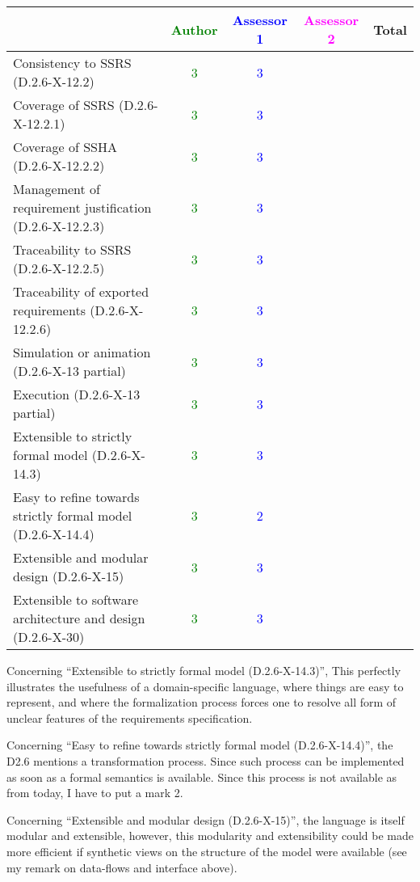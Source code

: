 \begin{tabular}{|l | c | c | c | c|}
\hline
& \textcolor{green}{Author} & \textcolor{blue}{Assessor 1} & \textcolor{magenta}{Assessor 2} & Total \\
\hline 
Consistency to SSRS (D.2.6-X-12.2) & \textcolor{green}{3} & \textcolor{blue}{3} & &  \\
\hline
Coverage of SSRS (D.2.6-X-12.2.1)  & \textcolor{green}{3} & \textcolor{blue}{3} & &  \\
\hline
Coverage of SSHA (D.2.6-X-12.2.2)  & \textcolor{green}{3} & \textcolor{blue}{3} & &  \\
\hline
Management of requirement justification (D.2.6-X-12.2.3)  & \textcolor{green}{3} & \textcolor{blue}{3} & &  \\
\hline
Traceability to  SSRS (D.2.6-X-12.2.5)  & \textcolor{green}{3} & \textcolor{blue}{3} & &  \\
\hline
Traceability of exported requirements (D.2.6-X-12.2.6)  & \textcolor{green}{3} & \textcolor{blue}{3} & &  \\
\hline
Simulation or animation (D.2.6-X-13 partial)  & \textcolor{green}{3} & \textcolor{blue}{3} & &  \\
\hline
Execution (D.2.6-X-13 partial)  & \textcolor{green}{3} & \textcolor{blue}{3} & &  \\
\hline
Extensible to strictly formal model (D.2.6-X-14.3) & \textcolor{green}{3} & \textcolor{blue}{3} & &  \\
\hline
Easy to refine towards strictly formal model (D.2.6-X-14.4) & \textcolor{green}{3} & \textcolor{blue}{2} & &  \\
\hline
Extensible and modular design (D.2.6-X-15)  & \textcolor{green}{3} & \textcolor{blue}{3} & &  \\
\hline
Extensible to software architecture and design (D.2.6-X-30)   & \textcolor{green}{3} & \textcolor{blue}{3} & &  \\
\hline
\end{tabular}


\begin{assessor1}
Concerning "`Extensible to strictly formal model (D.2.6-X-14.3)"', This perfectly illustrates the usefulness of a domain-specific language, where things are easy to represent, and where the formalization process forces one to resolve all form of unclear features of the requirements specification. 

Concerning "`Easy to refine towards strictly formal model (D.2.6-X-14.4)"', the D2.6 mentions a transformation process. Since such process can be implemented as soon as a formal semantics is available. Since this process is not available as from today, I have to put a mark 2. 

Concerning "`Extensible and modular design (D.2.6-X-15)"', the language is itself modular and extensible, however, this modularity and extensibility could be made more efficient if synthetic views on the structure of the model were available (see my remark on data-flows and interface above). 
\end{assessor1}


